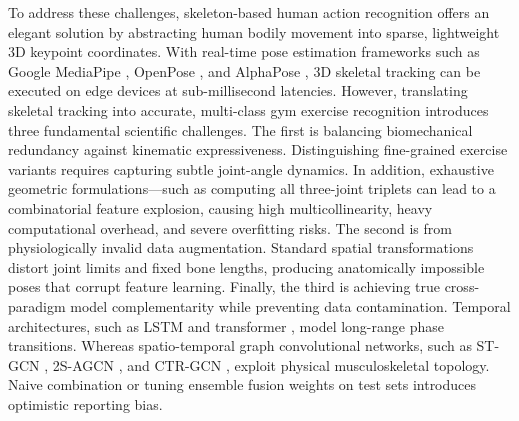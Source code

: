 \documentclass[preprint,12pt]{elsarticle}
\begin{document}
To address these challenges, skeleton-based human action recognition offers an elegant solution by abstracting human bodily movement into sparse, lightweight 3D keypoint coordinates. 
With real-time pose estimation frameworks such as Google MediaPipe \cite{chuankun2019,bazarevsky2020}, OpenPose \cite{cao2019}, and AlphaPose \cite{fang2022}, 3D skeletal tracking can be executed on edge devices at sub-millisecond latencies. 
However, translating skeletal tracking into accurate, multi-class gym exercise recognition introduces three fundamental scientific challenges.
The first is balancing biomechanical redundancy against kinematic expressiveness.
Distinguishing fine-grained exercise variants requires capturing subtle joint-angle dynamics.
In addition, exhaustive geometric formulations—such as computing all three-joint triplets can lead to a combinatorial feature explosion, causing high multicollinearity, heavy computational overhead, and severe overfitting risks.
The second is from physiologically invalid data augmentation.
Standard spatial transformations distort joint limits and fixed bone lengths, producing anatomically impossible poses that corrupt feature learning.
Finally, the third is achieving true cross-paradigm model complementarity while preventing data contamination. 
Temporal architectures, such as LSTM \cite{hochreiter1997long,graves2005} and transformer \cite{vaswani2017},  model long-range phase transitions.
Whereas spatio-temporal graph convolutional networks, such as ST-GCN \cite{yan2018}, 2S-AGCN \cite{shi2019two}, and CTR-GCN \cite{chen2021channel}, exploit physical musculoskeletal topology. 
Naive combination or tuning ensemble fusion weights on test sets introduces optimistic reporting bias.

\end{document}
